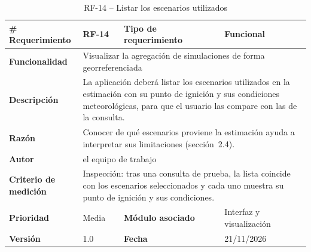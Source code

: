 \begin{longtable}{|p{\rqA}|p{\rqB}|p{\rqC}|p{\rqD}|}
  \caption{RF-14 -- Listar los escenarios utilizados}\label{tab:rf-14}\tabularnewline
  \hline
  \textbf{\# Requerimiento} & RF-14 & \raggedright\textbf{Tipo de requerimiento} & Funcional\tabularnewline\hline
  \raggedright\textbf{Funcionalidad} & \multicolumn{3}{p{\rqBCD}|}{Visualizar la agregación de simulaciones de forma georreferenciada}\tabularnewline\hline
  \endfirsthead
  \textbf{Descripción} & \multicolumn{3}{p{\rqBCD}|}{La aplicación deberá listar los escenarios utilizados en la estimación con su punto de ignición y sus condiciones meteorológicas, para que el usuario las compare con las de la consulta.}\tabularnewline\hline
  \textbf{Razón} & \multicolumn{3}{p{\rqBCD}|}{Conocer de qué escenarios proviene la estimación ayuda a interpretar sus limitaciones (sección~2.4).}\tabularnewline\hline
  \textbf{Autor} & \multicolumn{3}{p{\rqBCD}|}{el equipo de trabajo}\tabularnewline\hline
  \raggedright\textbf{Criterio de medición} & \multicolumn{3}{p{\rqBCD}|}{Inspección: tras una consulta de prueba, la lista coincide con los escenarios seleccionados y cada uno muestra su punto de ignición y sus condiciones.}\tabularnewline\hline
  \textbf{Prioridad} & Media & \raggedright\textbf{Módulo asociado} & Interfaz y visualización\tabularnewline\hline
  \textbf{Versión} & 1.0 & \textbf{Fecha} & 21/11/2026\tabularnewline\hline
\end{longtable}